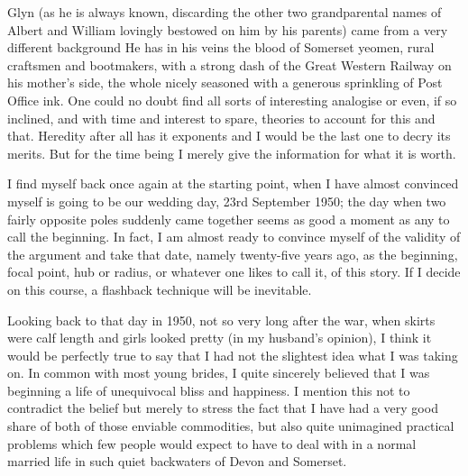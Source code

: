 Glyn (as he is always known, discarding the other two grandparental names of Albert and William lovingly bestowed on him by his parents) came from a very different background He has in his veins the blood of Somerset yeomen, rural craftsmen and bootmakers, with a strong dash of the Great Western Railway on his mother's side, the whole nicely seasoned with a generous sprinkling of Post Office ink. One could no doubt find all sorts of interesting analogise or even, if so inclined, and with time and interest to spare, theories to account for this and that. Heredity after all has it exponents and I would be the last one to decry its merits. But for the time being I merely give the information for what it is worth.

I find myself back once again at the starting point, when I have almost convinced myself is going to be our wedding day, 23rd September 1950; the day when two fairly opposite poles suddenly came together seems as good a moment as any to call the beginning. In fact, I am almost ready to convince myself of the validity of the argument and take that date, namely twenty-five years ago, as the beginning, focal point, hub or radius, or whatever one likes to call it, of this story. If I decide on this course, a flashback technique will be inevitable.

Looking back to that day in 1950, not so very long after the war, when skirts were calf length and girls looked pretty (in my husband's opinion), I think it would be perfectly true to say that I had not the slightest idea what I was taking on. In common with most young brides, I quite sincerely believed that I was beginning a life of unequivocal bliss and happiness. I mention this not to contradict the belief but merely to stress the fact that I have had a very good share of both of those enviable commodities, but also quite unimagined practical problems which few people would expect to have to deal with in a normal married life in such quiet backwaters of Devon and Somerset. 